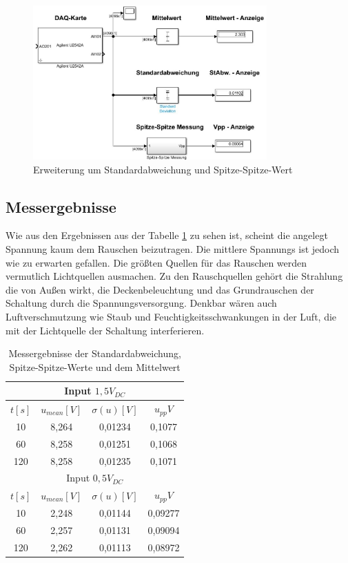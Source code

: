 \documentclass[a4paper]{article}
\begin{document}
\begin{figure}[h]
    \centering
    \includegraphics[width=0.8\textwidth]{schematics/6.3.3).jpg}
    \caption{Erweiterung um Standardabweichung und Spitze-Spitze-Wert}
    \label{fig:schematics-6-3-3-jpg}
\end{figure}

\subsection{Messergebnisse}
Wie aus den Ergebnissen aus der Tabelle \ref{tab:6-3-3} zu sehen ist, scheint
die angelegt Spannung kaum dem Rauschen beizutragen. Die mittlere Spannungs ist
jedoch wie zu erwarten gefallen. Die größten Quellen für das Rauschen werden
vermutlich Lichtquellen ausmachen. Zu den Rauschquellen gehört die Strahlung die
von Außen wirkt, die Deckenbeleuchtung und das Grundrauschen der Schaltung durch
die Spannungsversorgung. Denkbar wären auch Luftverschmutzung wie Staub und
Feuchtigkeitsschwankungen in der Luft, die mit der Lichtquelle der Schaltung
interferieren.

\begin{table}[h]
    \centering
    \caption{Messergebnisse der Standardabweichung, Spitze-Spitze-Werte und dem Mittelwert}
    \label{tab:6-3-3}
    \begin{tabular}{|c|c|c|c|}
        \hline
        \multicolumn{4}{|c|}{Input $1,5\unit{V_{DC}}$}\\
        \hline
        $t\unit{[s]}$ & $u_{mean}\unit{[V]}$ & $\sigma(u)\unit{[V]}$ &  $u_{pp}\unit{V}$ \\
        \hline
        10&8,264&0,01234&0,1077\\
        60 & 8,258 & 0,01251 & 0,1068\\
        120 & 8,258 & 0,01235 & 0,1071\\
        \hline
        \hline
        \multicolumn{4}{|c|}{Input $0,5\unit{V_{DC}}$}\\
        \hline
        $t\unit{[s]}$ & $u_{mean}\unit{[V]}$ & $\sigma(u)\unit{[V]}$ &  $u_{pp}\unit{V}$ \\
        \hline
        10  & 2,248 & 0,01144 & 0,09277\\
        60 & 2,257 & 0,01131 & 0,09094\\
        120 & 2,262 & 0,01113 & 0,08972\\
        \hline
    \end{tabular}
\end{table}
\end{document}
